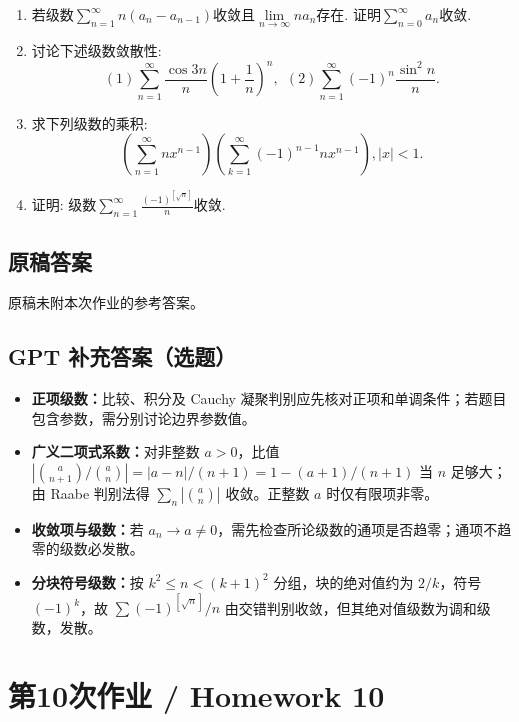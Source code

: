 \documentclass[UTF8,11pt, a4paper, oneside, fontset=none]{ctexbook}
\begin{document}
\begin{enumerate}
\item 若级数$\sum_{n=1}^{\infty} n (a_n - a_{n-1})$收敛且$\lim\limits_{n \to \infty}n a_n$存在. 证明$\sum_{n=0}^{\infty} a_n$收敛.

\item 讨论下述级数敛散性:
\[
(1) \sum_{n=1}^{\infty} \frac{\cos 3n}{n} \left( 1 + \frac{1}{n} \right)^n, \ \ (2) \sum_{n=1}^{\infty} (-1)^n \frac{\sin^2 n}{n}.
\]

\item 求下列级数的乘积:
\[
\left( \sum_{n=1}^{\infty} n x^{n-1} \right)  \left( \sum_{k=1}^{\infty} (-1)^{n-1} n x^{n-1} \right), |x| < 1. 
\]

\item 证明: 级数$\sum_{n=1}^{\infty} \frac{(-1)^{[\sqrt n]}}{n}$收敛.

\end{enumerate}
\clearpage
\subsection*{原稿答案}
\noindent 原稿未附本次作业的参考答案。
\clearpage
\subsection*{GPT 补充答案（选题）}
\begin{itemize}
\item \textbf{正项级数：}比较、积分及 Cauchy 凝聚判别应先核对正项和单调条件；若题目包含参数，需分别讨论边界参数值。
\item \textbf{广义二项式系数：}对非整数 $a>0$，比值 $|\binom a{n+1}/\binom a n|=|a-n|/(n+1)=1-(a+1)/(n+1)$ 当 $n$ 足够大；由 Raabe 判别法得 $\sum_n|\binom a n|$ 收敛。正整数 $a$ 时仅有限项非零。
\item \textbf{收敛项与级数：}若 $a_n\to a\ne0$，需先检查所论级数的通项是否趋零；通项不趋零的级数必发散。
\item \textbf{分块符号级数：}按 $k^2\le n<(k+1)^2$ 分组，块的绝对值约为 $2/k$，符号 $(-1)^k$，故 $\sum(-1)^{[\sqrt n]}/n$ 由交错判别收敛，但其绝对值级数为调和级数，发散。
\end{itemize}
\clearpage
\section{第10次作业 / Homework 10}
\end{document}
